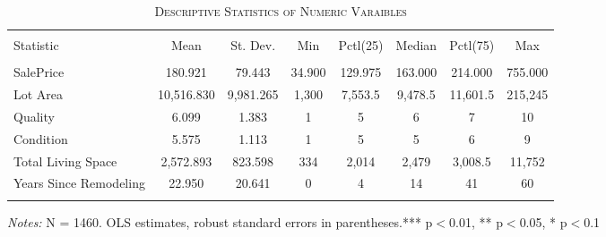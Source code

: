 \documentclass[a4paper]{article}
\begin{document}
\begin{table}[!htbp] 
\begin{adjustwidth}{-0.5cm}{-0cm}
\begin{threeparttable}
\small
\captionsetup{font=small, justification=raggedright,singlelinecheck=false}
\caption{\textsc{Descriptive Statistics of Numeric Varaibles}}
\centering 
  \label{}   
\begin{tabular}{@{\extracolsep{5pt}}lccccccc} 
\\[-5ex]\hline 
\hline \\[-1.8ex] 
Statistic & \multicolumn{1}{c}{Mean} & \multicolumn{1}{c}{St. Dev.} & \multicolumn{1}{c}{Min} & \multicolumn{1}{c}{Pctl(25)} & \multicolumn{1}{c}{Median} & \multicolumn{1}{c}{Pctl(75)} & \multicolumn{1}{c}{Max} \\ 
\hline \\[-1.8ex] 
SalePrice & 180.921 & 79.443 & 34.900 & 129.975 & 163.000 & 214.000 & 755.000 \\ 
Lot Area & 10,516.830 & 9,981.265 & 1,300 & 7,553.5 & 9,478.5 & 11,601.5 & 215,245 \\ 
Quality & 6.099 & 1.383 & 1 & 5 & 6 & 7 & 10 \\ 
Condition & 5.575 & 1.113 & 1 & 5 & 5 & 6 & 9 \\ 
Total Living Space & 2,572.893 & 823.598 & 334 & 2,014 & 2,479 & 3,008.5 & 11,752 \\ 
Years Since Remodeling & 22.950 & 20.641 & 0 & 4 & 14 & 41 & 60 \\ 
\hline \\[-3.5ex] 
\end{tabular} 
\begin{tablenotes}
      \small
      \item\textit{Notes:} N = 1460. OLS estimates, robust standard errors in parentheses.*** p$<$0.01, ** p$<$0.05, * p$<$0.1
    \end{tablenotes}
\end{threeparttable}
\end{adjustwidth}
\end{table}
\end{document}
